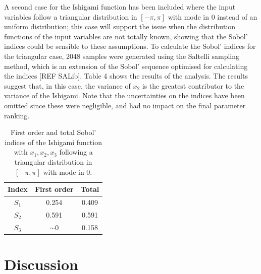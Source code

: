 \documentclass[twocolumn]{rps-esrel2022}
\begin{document}
A second case for the Ishigami function has been included where the input variables follow a triangular distribution in $[-\pi,\pi]$ with mode in $0$
instead of an uniform distribution; this case will support the issue when the distribution functions of the input variables are not totally known, showing
that the Sobol' indices could be sensible to these assumptions.
To calculate the Sobol' indices for the triangular case, 2048 samples were generated using the Saltelli sampling method, which is an extension of the Sobol'
sequence optimised for calculating the indices [REF SALib].
Table 4 shows the results of the analysis.
The results suggest that, in this case, the variance of $x_2$ is the greatest contributor to the variance of the Ishigami.
Note that the uncertainties on the indices have been omitted since these were negligible, and had no impact on the final parameter ranking.

\begin{table}[!h]
	\centering
	\caption{First order and total Sobol' indices of the Ishigami function with $x_1,x_2,x_3$ following a triangular distribution in $[-\pi,\pi]$
	with mode in $0$.}
	\begin{tabular}{ccc}
	\hline
	Index & First order & Total \\ \hline
	$S_1$ & 0.254 & 0.409\\
	$S_2$ & 0.591 & 0.591\\
	$S_3$ & $\sim0$ & 0.158\\ \hline
	\end{tabular}%
\end{table}


\section{Discussion}

\end{document}
